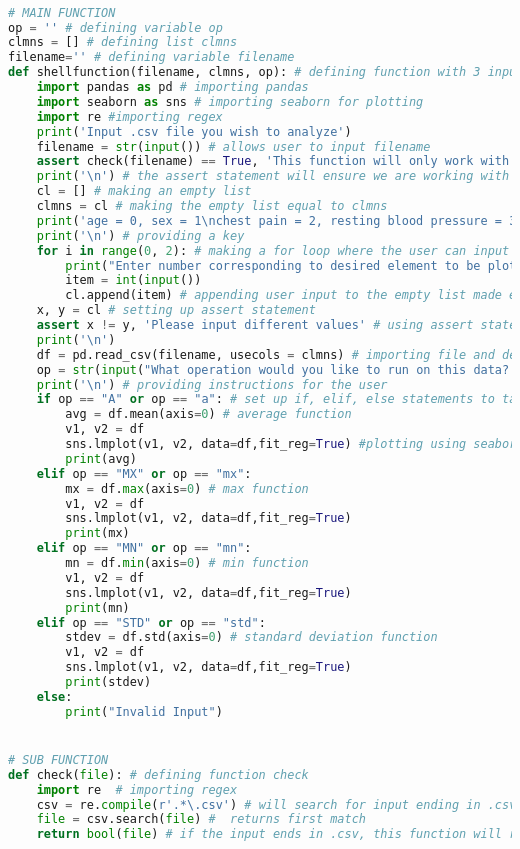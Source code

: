 \documentclass[letterpaper]{article}
\begin{document}
\begin{lstlisting}[language=Python]

# MAIN FUNCTION
op = '' # defining variable op
clmns = [] # defining list clmns
filename='' # defining variable filename
def shellfunction(filename, clmns, op): # defining function with 3 inputs
    import pandas as pd # importing pandas
    import seaborn as sns # importing seaborn for plotting 
    import re #importing regex
    print('Input .csv file you wish to analyze')
    filename = str(input()) # allows user to input filename
    assert check(filename) == True, 'This function will only work with .csv files\nPlease input a .csv file.'
    print('\n') # the assert statement will ensure we are working with a .csv file
    cl = [] # making an empty list
    clmns = cl # making the empty list equal to clmns
    print('age = 0, sex = 1\nchest pain = 2, resting blood pressure = 3\ncholesterol = 4, fasting blood sugar = 5\nresting ECG = 6, max heart rate = 7\nexercise induced angina = 8, ST depression induced by excercise = 9\nslope of the peak exercise ST segment = 10\nnumber of major vessels colored by flourosopy = 11\nthal = 12, target = 13')
    print('\n') # providing a key
    for i in range(0, 2): # making a for loop where the user can input what elements they want to use
        print("Enter number corresponding to desired element to be plotted")
        item = int(input()) 
        cl.append(item) # appending user input to the empty list made earlier
    x, y = cl # setting up assert statement
    assert x != y, 'Please input different values' # using assert statement to ensure differnt values are used
    print('\n')
    df = pd.read_csv(filename, usecols = clmns) # importing file and designating columns to use from pandas
    op = str(input("What operation would you like to run on this data?:\nAverage(A), Maximum(MX), Minimum(MN), Standard Deviation(STD)\nType A, MX, MN, or STD: "))
    print('\n') # providing instructions for the user
    if op == "A" or op == "a": # set up if, elif, else statements to take on use inputs
        avg = df.mean(axis=0) # average function
        v1, v2 = df
        sns.lmplot(v1, v2, data=df,fit_reg=True) #plotting using seaborn
        print(avg)
    elif op == "MX" or op == "mx":
        mx = df.max(axis=0) # max function
        v1, v2 = df
        sns.lmplot(v1, v2, data=df,fit_reg=True)
        print(mx)
    elif op == "MN" or op == "mn":
        mn = df.min(axis=0) # min function
        v1, v2 = df
        sns.lmplot(v1, v2, data=df,fit_reg=True)
        print(mn)
    elif op == "STD" or op == "std":
        stdev = df.std(axis=0) # standard deviation function
        v1, v2 = df
        sns.lmplot(v1, v2, data=df,fit_reg=True)
        print(stdev)
    else:
        print("Invalid Input")


# SUB FUNCTION
def check(file): # defining function check
    import re  # importing regex
    csv = re.compile(r'.*\.csv') # will search for input ending in .csv
    file = csv.search(file) #  returns first match
    return bool(file) # if the input ends in .csv, this function will return True
    
    
\end{lstlisting}
\end{document}
